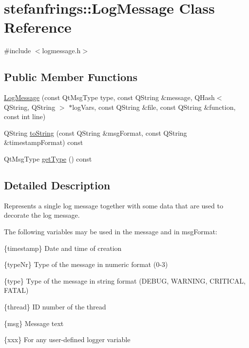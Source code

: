 \hypertarget{classstefanfrings_1_1_log_message}{}\section{stefanfrings\+:\+:Log\+Message Class Reference}
\label{classstefanfrings_1_1_log_message}


{\ttfamily \#include $<$logmessage.\+h$>$}

\subsection*{Public Member Functions}
\begin{DoxyCompactItemize}
\item 
\mbox{\hyperlink{classstefanfrings_1_1_log_message_a91ef335fb19eee7f7d26ee86cc3d4f86}{Log\+Message}} (const Qt\+Msg\+Type type, const Q\+String \&message, Q\+Hash$<$ Q\+String, Q\+String $>$ $\ast$log\+Vars, const Q\+String \&file, const Q\+String \&function, const int line)
\item 
Q\+String \mbox{\hyperlink{classstefanfrings_1_1_log_message_a0afc95ed8eb8b5cc611b5b9436f65053}{to\+String}} (const Q\+String \&msg\+Format, const Q\+String \&timestamp\+Format) const
\item 
Qt\+Msg\+Type \mbox{\hyperlink{classstefanfrings_1_1_log_message_a6e0563caa0e118de2b9664b08ee6c856}{get\+Type}} () const
\end{DoxyCompactItemize}


\subsection{Detailed Description}
Represents a single log message together with some data that are used to decorate the log message.

The following variables may be used in the message and in msg\+Format\+:


\begin{DoxyItemize}
\item \{timestamp\} Date and time of creation
\item \{type\+Nr\} Type of the message in numeric format (0-\/3)
\item \{type\} Type of the message in string format (D\+E\+B\+UG, W\+A\+R\+N\+I\+NG, C\+R\+I\+T\+I\+C\+AL, F\+A\+T\+AL)
\item \{thread\} ID number of the thread
\item \{msg\} Message text
\item \{xxx\} For any user-\/defined logger variable
\end{DoxyItemize}

